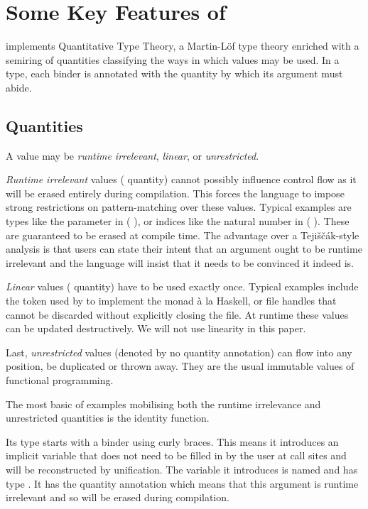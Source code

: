 
\section{Some Key Features of \idris}\label{sec:quantitativeTT}

\idris{} implements Quantitative Type Theory,
a Martin-Löf type theory enriched with a semiring of quantities
classifying the ways in which values may be used.
%
In a type, each binder is annotated with the quantity by which its
argument must abide.

\subsection{Quantities}

A value may be \emph{runtime irrelevant}, \emph{linear}, or \emph{unrestricted}.

\emph{Runtime irrelevant} values ( quantity) cannot possibly influence
control flow as it will be erased entirely during compilation.
%
This forces the language to impose strong restrictions on pattern-matching over these
values.
%
Typical examples are types like the  parameter in ( ),
or indices like the natural number  in
(  ).
%
These are guaranteed to be erased at compile time. The advantage over a Tejiščák-style
analysis is that users can state their intent that an argument ought to be runtime
irrelevant and the language will insist that it needs to be convinced it indeed is.

\emph{Linear} values ( quantity) have to be used exactly once.
%
Typical examples include the  token used by \idris{} to implement the
 monad à la Haskell, or file handles that cannot be discarded without explicitly
closing the file.
%
At runtime these values can be updated destructively. We will not use linearity in this paper.

Last, \emph{unrestricted} values (denoted by no quantity annotation) can flow into any
position, be duplicated or thrown away.
%
They are the usual immutable values of functional programming.

The most basic of examples mobilising both the runtime irrelevance and unrestricted
quantities is the identity function.


Its type starts with a binder using curly braces.
%
This means it introduces an implicit variable that does not need to be filled in by
the user at call sites and will be reconstructed by unification.
%
The variable it introduces is named  and
has type . It has the  quantity annotation which means
that this argument is runtime irrelevant and so will be erased during compilation.

